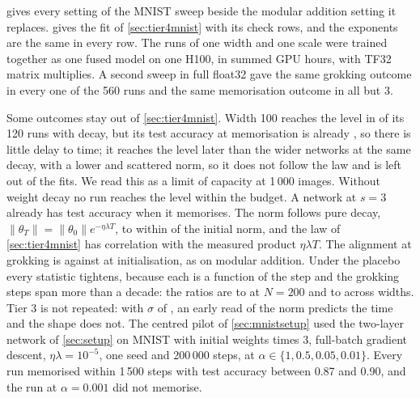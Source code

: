 \documentclass[a4paper,11pt]{article} %
\begin{document}
 gives every setting of the MNIST sweep beside
the modular addition setting it replaces.  gives the
fit of \cref{sec:tier4mnist} with its check rows, and the exponents are the
same in every row. The runs of one width and one
scale were trained together as one fused model on one H100, in
\EnineteenHours{} summed GPU hours, with TF32 matrix multiplies. A second
sweep in full float32 gave the same grokking outcome in every one of the 560
runs and the same memorisation outcome in all but 3.

Some outcomes stay out of \cref{sec:tier4mnist}. Width 100 reaches the
level in \EnineteenWhundredReached{} of its 120 runs with decay, but its test
accuracy at memorisation is already \EnineteenWhundredAccmem{}, so there is
little delay to time; it reaches the level later than the wider networks at
the same decay, with a lower and scattered norm, so it does not follow the
law and is left out of the fits. We read this as a limit of capacity at
1\,000 images. Without weight decay no run reaches the level within the
budget. A network at $s=3$ already has test accuracy
\EnineteenSthreeAccmem{} when it memorises. The norm
follows pure decay, $\lVert\theta_T\rVert=\lVert\theta_0\rVert
e^{-\eta\lambda T}$, to within \EnineteenPureGap{} of the initial norm, and
the law of \cref{sec:tier4mnist} has correlation \EnineteenCorr{} with the
measured product $\eta\lambda T$. The alignment at grokking is
\EnineteenAgrok{} against \EnineteenAzero{} at initialisation, as on modular
addition. Under the placebo every statistic tightens, because each is a
function of the step and the grokking steps span more than a decade: the
ratios are \EnineteenNtwohundredSRatio{} to \EnineteenNtwohundredARatio{} at
$N=200$ and \EnineteenScalesevenRRatio{} to \EnineteenScalesevenSRatio{}
across widths. Tier 3 is not repeated: with $\sigma$ of \EnineteenMainS{},
an early read of the norm predicts the time and the shape does not.
The centred pilot of
\cref{sec:mnistsetup} used the two-layer network of \cref{sec:setup} on
MNIST with initial weights times 3, full-batch gradient descent,
$\eta\lambda=10^{-5}$, one seed and 200\,000 steps, at
$\alpha\in\{1,0.5,0.05,0.01\}$. Every run memorised within 1\,500 steps with
test accuracy between 0.87 and 0.90, and the run at $\alpha=0.001$ did not
memorise.
\end{document}

